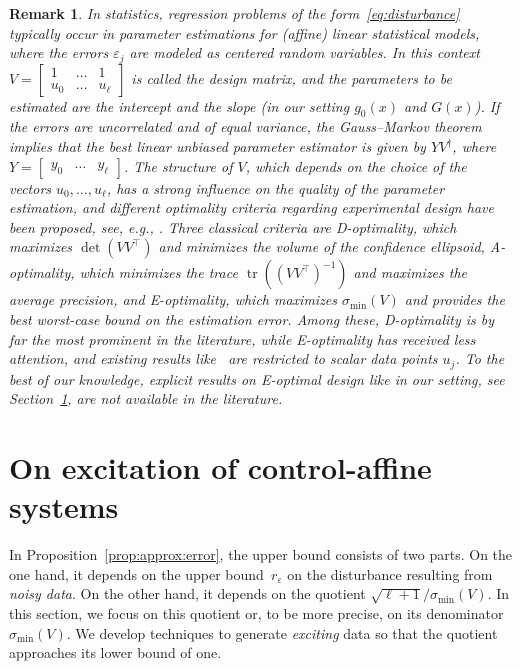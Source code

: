 \documentclass[a4paper, reqno]{amsart}
\newcommand{\dd}{\ell}
\newtheorem{remark}[theorem]{Remark}
\begin{document}
\begin{remark}
    In statistics, regression problems of the form~\eqref{eq:disturbance} typically occur in parameter estimations for (affine) linear statistical models, where the errors $\varepsilon_j$ are modeled as centered random variables. In this context $V=\left[\begin{smallmatrix} 1 & \dots & 1\\ u_0 & \dots & u_{\dd}\end{smallmatrix}\right]$ is called the design matrix, and the parameters to be estimated are the intercept and the slope (in our setting $g_0(x)$ and $G(x)$). If the errors are uncorrelated and of equal variance, the Gauss--Markov theorem implies that the best linear unbiased parameter estimator is given by $YV^\dagger$, where $Y=\begin{bmatrix}
        y_0&\dots & y_{\dd}
    \end{bmatrix}$. The structure of $V$, which depends on the choice of the vectors $u_0,\dots, u_{\dd}$, has a strong influence on the quality of the parameter estimation, and different optimality criteria regarding experimental design have been proposed, see, e.g., \cite{pukelsheim2006optimal}. Three classical criteria are D-optimality, which maximizes $\det(VV^\top)$ and minimizes the volume of the confidence ellipsoid, A-optimality, which minimizes the trace $\operatorname{tr}((VV^\top)^{-1})$ and maximizes the average precision, and E-optimality, which maximizes $\sigma_\mathrm{min}(V)$ and provides the best worst-case bound on the estimation error. Among these, D-optimality is by far the most prominent in the literature, while E-optimality has received less attention, and existing results like~\cite{pukelsheim1993optimal,heiligers1994optimal} are restricted to scalar data points $u_j$. To the best of our knowledge, explicit results on E-optimal design like in our setting, see Section~\ref{sec:excitation}, are not available in the literature.
\end{remark}




    \section{On excitation of control-affine systems} 
    \label{sec:excitation}
In Proposition~\ref{prop:approx:error}, the upper bound consists of two parts. 
On the one hand, it depends on the upper bound~$r_\varepsilon$ on the disturbance resulting from \textit{noisy data}. 
On the other hand, it depends on the quotient $\sqrt{\dd+1} / \sigma_{\operatorname{min}}(V)$. 
In this section, we focus on this quotient or, to be more precise, on its denominator~$\sigma_{\operatorname{min}}(V)$. We develop techniques to generate \emph{exciting} data so that the quotient approaches its lower bound of one. 
\end{document}
